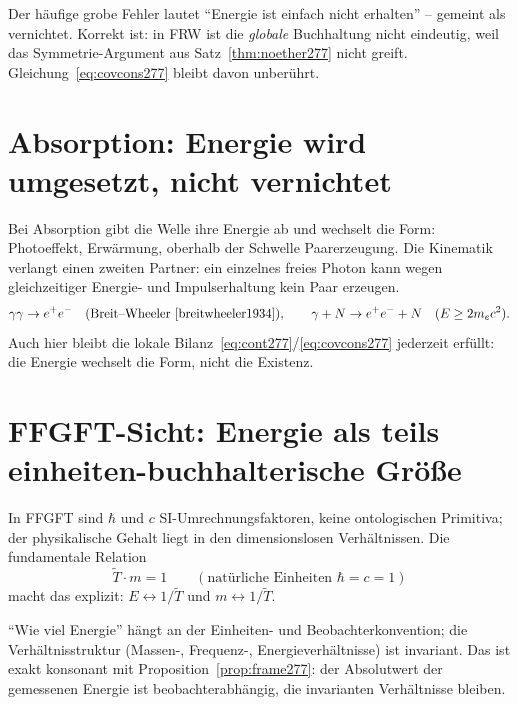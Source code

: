 \begin{remark}
Der häufige grobe Fehler lautet \enquote{Energie ist einfach nicht erhalten} --
gemeint als vernichtet. Korrekt ist: in FRW ist die \emph{globale} Buchhaltung
nicht eindeutig, weil das Symmetrie-Argument aus Satz~\ref{thm:noether277}
nicht greift. Gleichung~\eqref{eq:covcons277} bleibt davon unberührt.
\end{remark}

\section{Absorption: Energie wird umgesetzt, nicht vernichtet}

Bei Absorption gibt die Welle ihre Energie ab und wechselt die Form:
Photoeffekt, Erwärmung, oberhalb der Schwelle Paarerzeugung. Die Kinematik
verlangt einen zweiten Partner: ein einzelnes freies Photon kann wegen
gleichzeitiger Energie- und Impulserhaltung kein Paar erzeugen.
\begin{equation}
  \gamma\gamma \to e^+ e^-
  \quad(\text{Breit--Wheeler}~\cite{breitwheeler1934}),
  \qquad
  \gamma + N \to e^+ e^- + N
  \quad(E \geq 2 m_e c^2).
  \label{eq:pair277}
\end{equation}
Auch hier bleibt die lokale Bilanz~\eqref{eq:cont277}/\eqref{eq:covcons277}
jederzeit erfüllt: die Energie wechselt die Form, nicht die Existenz.

\section{FFGFT-Sicht: Energie als teils einheiten-buchhalterische Größe}

In FFGFT sind $\hbar$ und $c$ SI-Umrechnungsfaktoren, keine ontologischen
Primitiva; der physikalische Gehalt liegt in den dimensionslosen
Verhältnissen. Die fundamentale Relation
\begin{equation}
  \tilde T \cdot m = 1
  \qquad(\text{natürliche Einheiten } \hbar = c = 1)
  \label{eq:Tm277}
\end{equation}
macht das explizit: $E \leftrightarrow 1/\tilde T$ und $m \leftrightarrow
1/\tilde T$.

\begin{insight}
\enquote{Wie viel Energie} hängt an der Einheiten- und Beobachterkonvention;
die Verhältnisstruktur (Massen-, Frequenz-, Energieverhältnisse) ist invariant.
Das ist exakt konsonant mit Proposition~\ref{prop:frame277}: der Absolutwert
der gemessenen Energie ist beobachterabhängig, die invarianten Verhältnisse
bleiben.
\end{insight}

